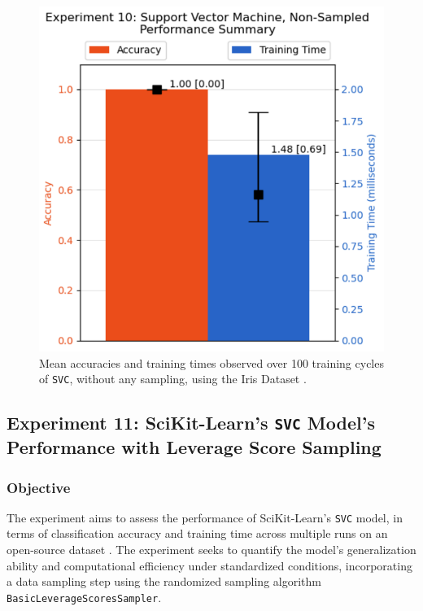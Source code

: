 \documentclass{article}
\theoremstyle{plain}
\theoremstyle{definition}
\theoremstyle{remark}
\begin{document}
\begin{figure}[ht]
	\vskip 0.2in
	\begin{center}
		\centerline{\includegraphics[width=\columnwidth]{experiment_10}}
		\caption{Mean accuracies and training times observed over 100 training cycles of \texttt{SVC}, without any sampling, using the Iris Dataset \cite{iris}.}
		\label{experiment_10}
	\end{center}
	\vskip -0.2in
\end{figure}


\subsection{Experiment 11: SciKit-Learn's \texttt{SVC} Model's Performance with Leverage Score Sampling}

\subsubsection{Objective}

The experiment aims to assess the performance of SciKit-Learn's \texttt{SVC} model, in terms of classification accuracy and training time across multiple runs on an open-source dataset \cite{iris}. The experiment seeks to quantify the model's generalization ability and computational efficiency under standardized conditions, incorporating a data sampling step using the randomized sampling algorithm \texttt{BasicLeverageScoresSampler}.
\end{document}
